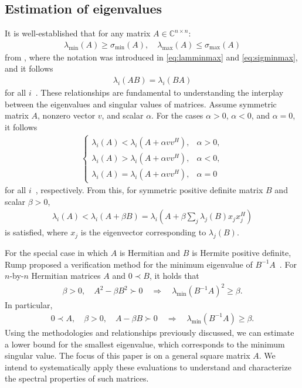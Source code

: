 \subsection{Estimation of eigenvalues}

It is well-established that for any matrix $A \in \mathbb{C}^{n \times n}$:
\begin{align}
\lambda_{\min}(A) \geq \sigma_{\min}(A),\quad \lambda_{\max}(A) \leq \sigma_{\max}(A)\label{eq:eig1}
\end{align}
from \cite[Theorem~5.6.9]{horn2012matrix}, where the notation was introduced in \eqref{eq:lamminmax} and \eqref{eq:sigminmax}, and it follows
\begin{align}
\lambda_{i}(AB) = \lambda_{i}(BA)\label{eq:eig2}
\end{align}
for all $i$~\cite[p. 55]{horn2012matrix}. 
These relationships are fundamental to understanding the interplay between the eigenvalues and singular values of matrices.
Assume symmetric matrix $A$, nonzero vector $v$, and scalar $\alpha$. 
For the cases $\alpha>0$, $\alpha<0$, and $\alpha=0$, it follows
\begin{align}
    \begin{cases}
        \lambda_i(A)<\lambda_i(A+\alpha vv^H), & \alpha>0,\\
        \lambda_i(A)>\lambda_i(A+\alpha vv^H), & \alpha<0,\\
        \lambda_i(A)=\lambda_i(A+\alpha vv^H), & \alpha=0
    \end{cases}
\end{align}
for all $i$~\cite{golub1973some,bunch1978rank}, respectively.
From this, for symmetric positive definite matrix $B$ and scalar $\beta>0$,
\begin{align}
    \lambda_i(A)<\lambda_i(A+\beta B)=\lambda_i\left(A+\beta\sum_j\lambda_j(B)x_jx_j^H\right)
\end{align}
is satisfied, where $x_j$ is the eigenvector corresponding to $\lambda_j(B)$.

For the special case in which $A$ is Hermitian and $B$ is Hermite positive definite, Rump proposed a verification method for the minimum eigenvalue of $B^{-1}A$~\cite{rump2011verified}.
For $n$-by-$n$ Hermitian matrices $A$ and $0\prec B$, it holds that
\begin{align}
    \beta>0,\quad A^2-\beta B^2\succ 0 \quad \Longrightarrow \quad  \lambda_{\min}(B^{-1}A)^2\geq \beta.\label{eq:mineig2}
\end{align}
In particular,
\begin{align}
    0\prec A,\quad \beta>0,\quad A-\beta B\succ 0 \quad \Longrightarrow \quad  \lambda_{\min}(B^{-1}A)\geq \beta.\label{eq:mineig}
\end{align}
Using the methodologies and relationships previously discussed, we can estimate a lower bound for the smallest eigenvalue, which corresponds to the minimum singular value. The focus of this paper is on a general square matrix $A$. We intend to systematically apply these evaluations to understand and characterize the spectral properties of such matrices.




